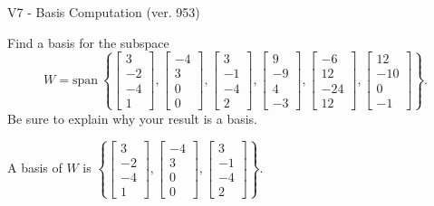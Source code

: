 \begin{exercise}
  \begin{exerciseTitle}V7 - Basis Computation (ver. 953)\end{exerciseTitle}
  \begin{exerciseStatement}
    Find a basis for the subspace 
\[W=\mathrm{span}\ \left\{\left[\begin{array}{r}
3 \\
-2 \\
-4 \\
1
\end{array}\right] , \left[\begin{array}{r}
-4 \\
3 \\
0 \\
0
\end{array}\right] , \left[\begin{array}{r}
3 \\
-1 \\
-4 \\
2
\end{array}\right] , \left[\begin{array}{r}
9 \\
-9 \\
4 \\
-3
\end{array}\right] , \left[\begin{array}{r}
-6 \\
12 \\
-24 \\
12
\end{array}\right] , \left[\begin{array}{r}
12 \\
-10 \\
0 \\
-1
\end{array}\right]\right\}.\]
 Be sure to explain why your result is a basis.


  \end{exerciseStatement}
  \begin{exerciseAnswer}
   A basis of \(W\) is  \(\left\{\left[\begin{array}{r}
3 \\
-2 \\
-4 \\
1
\end{array}\right] , \left[\begin{array}{r}
-4 \\
3 \\
0 \\
0
\end{array}\right] , \left[\begin{array}{r}
3 \\
-1 \\
-4 \\
2
\end{array}\right]\right\}\).
  


  \end{exerciseAnswer}
\end{exercise}